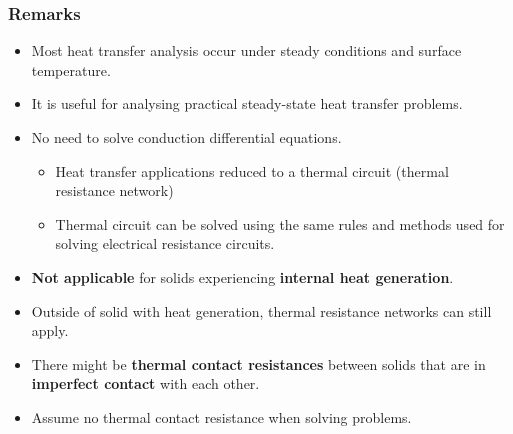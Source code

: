 \documentclass[11pt]{article}
\begin{document}
\subsubsection{Remarks}
\label{sec:org2f33e14}
\begin{itemize}
\item Most heat transfer analysis occur under steady conditions and surface temperature.
\item It is useful for analysing practical steady-state heat transfer problems.
\item No need to solve conduction differential equations.
\begin{itemize}
\item Heat transfer applications reduced to a thermal circuit (thermal resistance network)
\item Thermal circuit can be solved using the same rules and methods used for solving electrical resistance circuits.
\end{itemize}
\item \textbf{Not applicable} for solids experiencing \textbf{internal heat generation}.
\item Outside of solid with heat generation, thermal resistance networks can still apply.
\item There might be \textbf{thermal contact resistances} between solids that are in \textbf{imperfect contact} with each other.
\item Assume no thermal contact resistance when solving problems.
\end{itemize}

 \newpage
\end{document}
